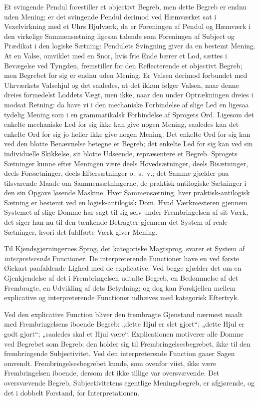 \documentclass[12pt]{book}
\newcommand{\opage}[1]{\marginnote{\footnotesize\textit{[#1]}}}
\begin{document}
Et svingende Pendul forestiller et objectivt Begreb, men
dette Begreb er endnu uden Mening; er det svingende Pendul
derimod ved Hæmværket sat i Vexelvirkning med et Uhrs
Hjulværk, da er Foreningen af Pendul og Hæmværk i den
virkelige Sammensætning ligesaa talende som Foreningen af
Subject og Prædikat i den logiske Sætning: Pendulets
Svingning giver da en bestemt Mening. At en Valse, omviklet
med en Snor, hvis frie Ende bærer et Lod, sættes i
\opage{171}Bevægelse ved Tyngden, fremstiller for den Reflecterende et
objectivt Begreb; men Begrebet for sig er endnu uden Mening.
Er Valsen derimod forbundet med Uhrværkets Valsehjul og
det saaledes, at det ikkun følger Valsen, naar denne dreies
formedelst Loddets Vægt, men ikke, naar den under Optrækningen
dreies i modsat Retning: da have vi i den mechaniske
Forbindelse af slige Led en ligesaa tydelig Mening som i en
grammatikalsk Forbindelse af Sprogets Ord. Ligesom det
enkelte mechaniske Led for sig ikke kan give nogen Mening,
saaledes kan det enkelte Ord for sig jo heller ikke give nogen
Mening. Det enkelte Ord for sig kan ved den blotte Benævnelse
betegne et Begreb; det enkelte Led for sig kan ved
sin individuelle Skikkelse, sit blotte Udseende, repræsentere et
Begreb. Sprogets Sætninger kunne efter Meningen være
deels Hovedsætninger, deels Bisætninger, deels Forsætninger,
deels Eftersætninger o.\ s.\ v.; det Samme gjælder paa tilsvarende
Maade om Sammensætningerne, de praktisk-antilogiske
Sætninger i den sin Opgave løsende Maskine. Hver Sammensætning,
hver praktisk-antilogisk Sætning er bestemt ved en
logisk-antilogisk Dom. Hvad Værkmesteren gjennem Systemet
af slige Domme har sagt til sig selv under Frembringelsen af
sit Værk, det siger han nu til den tænkende Betragter gjennem
det System af reale Sætninger, hvori det fuldførte Værk
giver Mening.

Til Kjendsgjerningernes Sprog, det kategoriske Magtsprog,
svarer et System af \emph{interpreterende} Functioner.
De interpreterende Functioner have en ved første Øiekast paafaldende
Lighed med de explicative. Ved begge gjælder det
om en Gjenkjendelse af det i Frembringelsen udtalte Begreb,
en Bedømmelse af det Frembragte, en Udvikling af dets Betydning;
og dog kan Forskjellen mellem explicative og interpreterende
Functioner udhæves med kategorisk Eftertryk.

Ved den explicative Function bliver den frembragte
Gjenstand nærmest maalt med Frembringelsens iboende
Be\opage{172}greb: „dette Hjul er slet gjort“; „dette Hjul er godt gjort“;
„saaledes skal et Hjul være“. Explicationen motiverer alle
Domme ved Begrebet som Begreb; den holder sig til Frembringelsesbegrebet,
ikke til den frembringende Subjectivitet.
Ved den interpreterende Function gaaer Sagen omvendt.
Frembringelsesbegrebet kunde, som ovenfor viist, ikke være
Frembringelsen iboende, dersom det ikke tillige var oversvævende.
Det oversvævende Begreb, Subjectivitetens egentlige
Meningsbegreb, er afgjørende, og det i dobbelt Forstand, for
Interpretationen.
\end{document}
